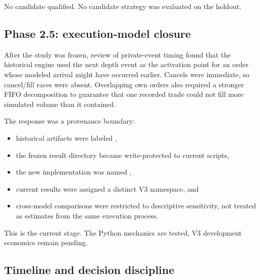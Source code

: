 No candidate qualified. No candidate strategy was evaluated on the holdout.

\subsection{Phase 2.5: execution-model closure}

After the study was frozen, review of private-event timing found that the
historical engine used the next depth event as the activation point for an order
whose modeled arrival might have occurred earlier. Cancels were immediate, so
cancel/fill races were absent. Overlapping own orders also required a stronger
FIFO decomposition to guarantee that one recorded trade could not fill more
simulated volume than it contained.

The response was a provenance boundary:

\begin{itemize}
  \item historical artifacts were labeled \LegacyModel,
  \item the frozen result directory became write-protected to current scripts,
  \item the new implementation was named \CurrentModel,
  \item current results were assigned a distinct V3 namespace, and
  \item cross-model comparisons were restricted to descriptive sensitivity,
        not treated as estimates from the same execution process.
\end{itemize}

This is the current stage. The Python mechanics are tested, V3 development
economics remain pending.

\subsection{Timeline and decision discipline}

